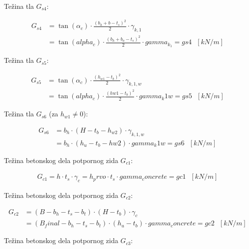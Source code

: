 \documentclass[a4paper, 11pt]{article}
\begin{document}
Te\v{z}ina tla $G_{s4}$:

\begin{align*}
G_{s4} &= \tan{(\alpha_{c})} \cdot \frac{(b_{h} + b - t_{s})^2}{2} \cdot \gamma_{k,1} \\
	   &= \tan{(alpha_c)} \cdot \frac{(b_h + b_o - t_s)^2}{2} \cdot gamma_k_1 = gs4 \text{ } [kN/m]
\end{align*}

Te\v{z}ina tla $G_{s5}$:

\begin{align*}
G_{s5} &= \tan{(\alpha_{c})} \cdot \frac{(h_{w1} - t_{b})^2}{2} \cdot \gamma_{k,1,w} \\
       &= \tan{(alpha_c)} \cdot \frac{(hw1 - t_b)^2}{2} \cdot gamma_k1w = gs5 \text{ } [kN/m]
\end{align*}

Te\v{z}ina tla $G_{s6}$ (za $h_{w1} \neq 0$):

\begin{align*}
G_{s6} &= b_{h} \cdot (H - t_{b} - h_{w2}) \cdot \gamma_{k,1,w} \\
       &= b_h \cdot (h_u - t_b - hw2) \cdot gamma_k1w = gs6 \text{ } [kN/m]
\end{align*}



Te\v{z}ina betonskog dela potpornog zida $G_{c1}$:

\begin{align*}
G_{c1} = h \cdot t_{s} \cdot \gamma_{c} = h_prvo \cdot t_s \cdot gamma_concrete = gc1 \text{ } [kN/m]
\end{align*}

Te\v{z}ina betonskog dela potpornog zida $G_{c2}$:

\begin{align*}
G_{c2} &= (B - b_{h} - t_{s} - b_{t}) \cdot (H-t_{b}) \cdot \gamma_{c} \\
	   &= (B_final - b_h - t_s - b_t) \cdot (h_u - t_b) \cdot gamma_concrete = gc2 \text{ } [kN/m]
\end{align*}

Te\v{z}ina betonskog dela potpornog zida $G_{c3}$:
\end{document}
